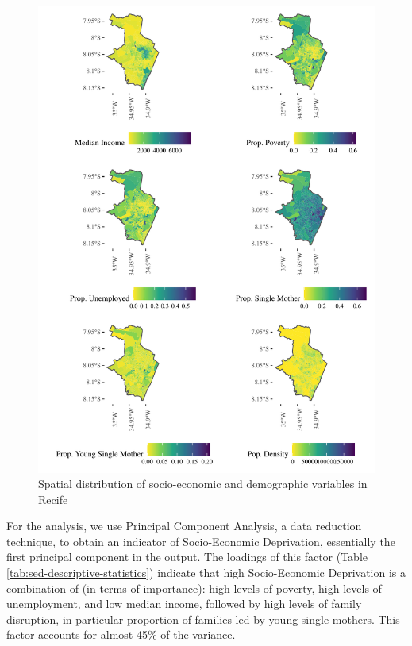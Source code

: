 \documentclass[smallextended]{svjour3}       %
\begin{document}
\begin{figure}

\includegraphics{Moral_Communities_and_Crime_files/figure-latex/fig-plot-sed-variables-1} \hfill{}

\caption{\label{fig:plot-sed-variables}Spatial distribution of socio-economic and demographic variables in Recife}\label{fig:fig-plot-sed-variables}
\end{figure}

For the analysis, we use Principal Component Analysis, a data reduction
technique, to obtain an indicator of Socio-Economic Deprivation,
essentially the first principal component in the output. The loadings of
this factor (Table \ref{tab:sed-descriptive-statistics}) indicate that
high Socio-Economic Deprivation is a combination of (in terms of
importance): high levels of poverty, high levels of unemployment, and
low median income, followed by high levels of family disruption, in
particular proportion of families led by young single mothers. This
factor accounts for almost 45\% of the variance.
\end{document}
